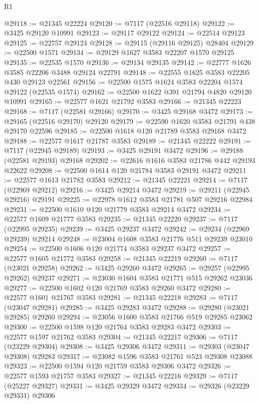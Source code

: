 \begin{lexlean}{R1}
\begin{coremodule}
@29118 := @21345 @22224
@29120 := @7117 (@22516 @29118)
@29122 := @3425 @29120 @10991
@29123 := @29117 @29122
@29124 := @22514 @29123
@29125 := @22757 @29124
@29128 := @29115 (@29116 @29125) @28404
@29129 := @22500 @1571
@29134 := @29129 @1627 @3583 @22207 @1570 @29125
@29135 := @22535 @1570
@29136 := @29134 @29135
@29142 := @22777 @1626 @3585 @22206 @3488 @29124 @22791
@29148 := @22555 @1625 @3583 @22205 @430 @29123 @22561
@29156 := @22500 @1575 @1624 @3583 @22204 @1574 @29122 (@22535 @1574)
@29162 := @22500 @1622 @391 @21794 @4820 @29120 @10991
@29165 := @22577 @1621 @21792 @3583
@29166 := @21345 @22223
@29168 := @7117 (@22581 @29166)
@29170 := @3425 @29168 @3472
@29173 := @29165 (@22516 @29170) @29120
@29179 := @22590 @1620 @3583 @21791 @438 @29170 @22596
@29185 := @22500 @1618 @120 @21789 @3583 @29168 @3472
@29188 := @22577 @1617 @21787 @3583
@29189 := @21345 @22222
@29191 := @7117 (@22945 @29189)
@29193 := @3425 @29191 @3472
@29196 := @29188 (@22581 @29193) @29168
@29202 := @22616 @1616 @3583 @21786 @442 @29193 @22622
@29208 := @22500 @1614 @120 @21784 @3583 @29191 @3472
@29211 := @22577 @1613 @21782 @3583
@29212 := @21345 @22221
@29214 := @7117 (@22969 @29212)
@29216 := @3425 @29214 @3472
@29219 := @29211 (@22945 @29216) @29191
@29225 := @22978 @1612 @3583 @21781 @507 @29216 @22984
@29231 := @22500 @1610 @120 @21779 @3583 @29214 @3472
@29234 := @22577 @1609 @21777 @3583
@29235 := @21345 @22220
@29237 := @7117 (@22995 @29235)
@29239 := @3425 @29237 @3472
@29242 := @29234 (@22969 @29239) @29214
@29248 := @23004 @1608 @3583 @21776 @511 @29239 @23010
@29254 := @22500 @1606 @120 @21774 @3583 @29237 @3472
@29257 := @22577 @1605 @21772 @3583
@29258 := @21345 @22219
@29260 := @7117 (@23021 @29258)
@29262 := @3425 @29260 @3472
@29265 := @29257 (@22995 @29262) @29237
@29271 := @23030 @1604 @3583 @21771 @515 @29262 @23036
@29277 := @22500 @1602 @120 @21769 @3583 @29260 @3472
@29280 := @22577 @1601 @21767 @3583
@29281 := @21345 @22218
@29283 := @7117 (@23047 @29281)
@29285 := @3425 @29283 @3472
@29288 := @29280 (@23021 @29285) @29260
@29294 := @23056 @1600 @3583 @21766 @519 @29285 @23062
@29300 := @22500 @1598 @120 @21764 @3583 @29283 @3472
@29303 := @22577 @1597 @21762 @3583
@29304 := @21345 @22217
@29306 := @7117 (@23229 @29304)
@29308 := @3425 @29306 @3472
@29311 := @29303 (@23047 @29308) @29283
@29317 := @23082 @1596 @3583 @21761 @523 @29308 @23088
@29323 := @22500 @1594 @120 @21759 @3583 @29306 @3472
@29326 := @22577 @1593 @21757 @3583
@29327 := @21345 @22216
@29329 := @7117 (@25227 @29327)
@29331 := @3425 @29329 @3472
@29334 := @29326 (@23229 @29331) @29306

\end{coremodule}
\end{lexlean}
